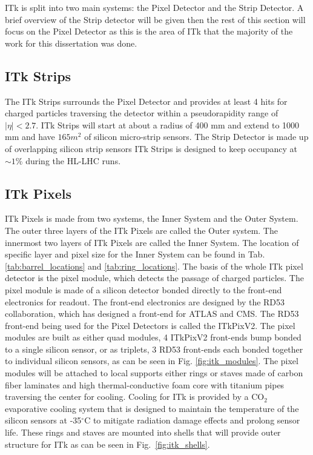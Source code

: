 ITk is split into two main systems: the Pixel Detector and the Strip Detector.
A brief overview of the Strip detector will be given then the rest of this section will focus on the Pixel Detector as this is the area of ITk that the majority of the work for this dissertation was done. 


\subsection{ITk Strips}
The ITk Strips surrounds the Pixel Detector and provides at least 4 hits for charged particles traversing the detector within a pseudorapidity range of $|\eta| < 2.7$.
ITk Strips will start at about a radius of 400 mm and extend to 1000 mm and have $165m^2$ of silicon micro-strip sensors.
The Strip Detector is made up of overlapping silicon strip sensors ITk Strips is designed to keep occupancy at $\sim1\%$ during the HL-LHC runs.



\subsection{ITk Pixels}


ITk Pixels is made from two systems, the Inner System and the Outer System. 
The outer three layers of the ITk Pixels are called the Outer system. 
The innermost two layers of ITk Pixels are called the Inner System.
The location of specific layer and pixel size for the Inner System can be found in Tab. \ref{tab:barrel_locations} and \ref{tab:ring_locations}.
The basis of the whole ITk pixel detector is the pixel module, which detects the passage of charged particles.
The pixel module is made of a silicon detector bonded directly to the front-end electronics for readout. 
The front-end electronics are designed by the RD53 collaboration, which has designed a front-end for ATLAS and CMS.
The RD53 front-end being used for the Pixel Detectors is called the ITkPixV2.
The pixel modules are built as either quad modules, 4 ITkPixV2 front-ends bump bonded to a single silicon sensor, or as triplets, 3 RD53 front-ends each bonded together to individual silicon sensors, as can be seen in Fig. \ref{fig:itk_modules}. 
The pixel modules will be attached to local supports either rings or staves made of carbon fiber laminates and high thermal-conductive foam core with titanium pipes traversing the center for cooling. 
Cooling for ITk is provided by a  \(\mathrm{CO_2}\) evaporative cooling system that is designed to maintain the temperature of the silicon sensors at -35$^\circ$C to mitigate radiation damage effects and prolong sensor life. 
These rings and staves are mounted into shells that will provide outer structure for ITk as can be seen in Fig.~\ref{fig:itk_shells}.

